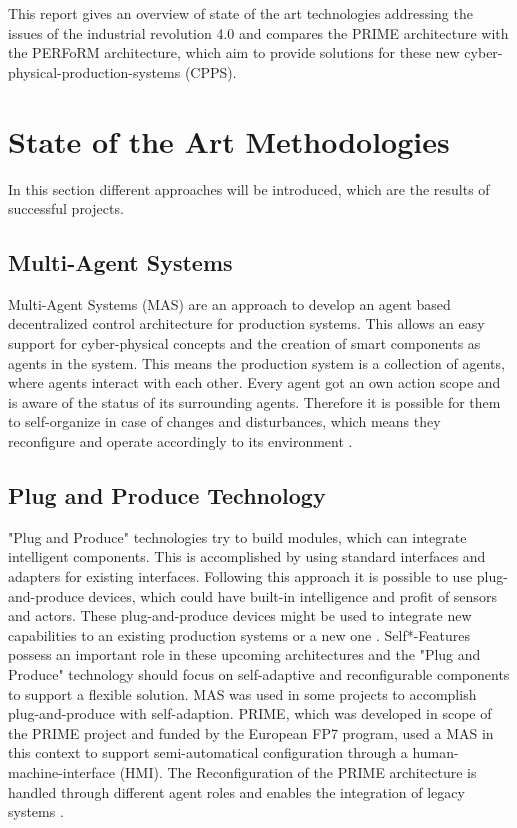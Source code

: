 \documentclass[conference,compsoc,hidelinks]{IEEEtran}
\begin{document}
This report gives an overview of state of the art technologies addressing the issues of the industrial revolution 4.0 and compares the PRIME architecture with the PERFoRM architecture, which aim to provide solutions for these new cyber-physical-production-systems (CPPS).





\IEEEpeerreviewmaketitle

\section{State of the Art Methodologies} \label{sec:state-of-the-art}%
In this section different approaches will be introduced, which are the results of successful projects. 

\subsection{Multi-Agent Systems}
Multi-Agent Systems (MAS) are an approach to develop an agent based decentralized control architecture for production systems. This allows an easy support for cyber-physical concepts and the creation of smart components as agents in the system. This means the production system is a collection of agents, where agents interact with each other. Every agent got an own action scope and is aware of the status of its surrounding agents. Therefore it is possible for them to self-organize in case of changes and disturbances, which means they reconfigure and operate accordingly to its environment \cite{HarmonizedSystems,Peres2017}.

\subsection{Plug and Produce Technology}
"Plug and Produce" technologies try to build modules, which can integrate intelligent components. This is accomplished by using standard interfaces and adapters for existing interfaces. Following this approach it is possible to use plug-and-produce devices, which could have built-in intelligence and profit of sensors and actors. These plug-and-produce devices might be used to integrate new capabilities to an existing production systems or a new one \cite{HarmonizedSystems}. Self*-Features possess an important role in these upcoming architectures \cite{SpecPERFoRM} and the "Plug and Produce" technology should focus on self-adaptive and reconfigurable components to support a flexible solution. MAS was used in some projects to accomplish plug-and-produce with self-adaption. PRIME, which was developed in scope of the PRIME project and funded by the European FP7 program, used a MAS in this context to support semi-automatical configuration through a human-machine-interface (HMI). The Reconfiguration of the PRIME architecture is handled through different agent roles and enables the integration of legacy systems \cite{HarmonizedSystems}.
\end{document}
